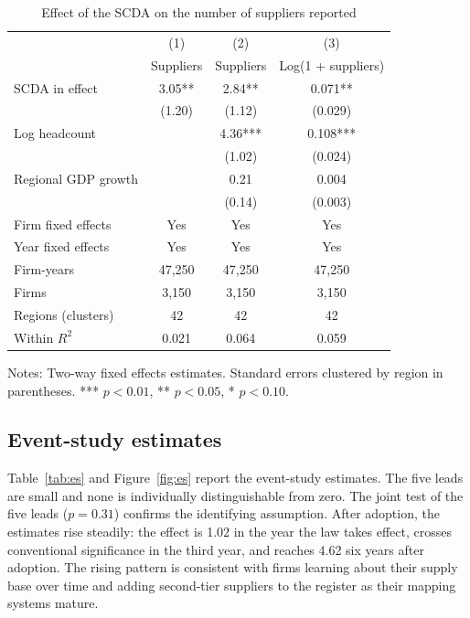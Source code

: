 \documentclass[11pt]{article}
\begin{document}
\begin{table}[ht]
\centering
\begin{threeparttable}
\caption{Effect of the SCDA on the number of suppliers reported}
\label{tab:main}
\small
\begin{tabular}{lccc}
\toprule
 & (1) & (2) & (3) \\
 & Suppliers & Suppliers & Log(1 + suppliers) \\
\midrule
SCDA in effect & 3.05** & 2.84** & 0.071** \\
 & (1.20) & (1.12) & (0.029) \\
Log headcount & & 4.36*** & 0.108*** \\
 & & (1.02) & (0.024) \\
Regional GDP growth & & 0.21 & 0.004 \\
 & & (0.14) & (0.003) \\
\midrule
Firm fixed effects & Yes & Yes & Yes \\
Year fixed effects & Yes & Yes & Yes \\
Firm-years & 47,250 & 47,250 & 47,250 \\
Firms & 3,150 & 3,150 & 3,150 \\
Regions (clusters) & 42 & 42 & 42 \\
Within $R^2$ & 0.021 & 0.064 & 0.059 \\
\bottomrule
\end{tabular}
\begin{tablenotes}\footnotesize
\item Notes: Two-way fixed effects estimates. Standard errors clustered by region in parentheses. *** $p<0.01$, ** $p<0.05$, * $p<0.10$.
\end{tablenotes}
\end{threeparttable}
\end{table}

\subsection{Event-study estimates}

Table~\ref{tab:es} and Figure~\ref{fig:es} report the event-study estimates. The five leads are small and none is individually distinguishable from zero. The joint test of the five leads ($p = 0.31$) confirms the identifying assumption. After adoption, the estimates rise steadily: the effect is 1.02 in the year the law takes effect, crosses conventional significance in the third year, and reaches 4.62 six years after adoption. The rising pattern is consistent with firms learning about their supply base over time and adding second-tier suppliers to the register as their mapping systems mature.
\end{document}
